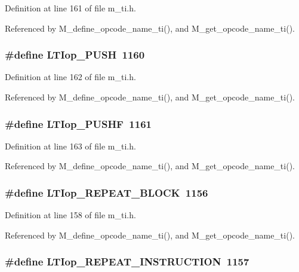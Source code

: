 Definition at line 161 of file m\_\-ti.h.

Referenced by M\_\-define\_\-opcode\_\-name\_\-ti(), and M\_\-get\_\-opcode\_\-name\_\-ti().
\subsubsection{\setlength{\rightskip}{0pt plus 5cm}\#define LTIop\_\-PUSH~1160}\label{m__ti_8h_01b504c987932f06e2611701fe6e2b5a}




Definition at line 162 of file m\_\-ti.h.

Referenced by M\_\-define\_\-opcode\_\-name\_\-ti(), and M\_\-get\_\-opcode\_\-name\_\-ti().
\subsubsection{\setlength{\rightskip}{0pt plus 5cm}\#define LTIop\_\-PUSHF~1161}\label{m__ti_8h_21097b126d9a1291f0eb8ce6a5ec7103}




Definition at line 163 of file m\_\-ti.h.

Referenced by M\_\-define\_\-opcode\_\-name\_\-ti(), and M\_\-get\_\-opcode\_\-name\_\-ti().
\subsubsection{\setlength{\rightskip}{0pt plus 5cm}\#define LTIop\_\-REPEAT\_\-BLOCK~1156}\label{m__ti_8h_f56575bf2c4d5e4aa2d42bf1f311ece1}




Definition at line 158 of file m\_\-ti.h.

Referenced by M\_\-define\_\-opcode\_\-name\_\-ti(), and M\_\-get\_\-opcode\_\-name\_\-ti().
\subsubsection{\setlength{\rightskip}{0pt plus 5cm}\#define LTIop\_\-REPEAT\_\-INSTRUCTION~1157}\label{m__ti_8h_a767d6e08e5aa576badbdabf7636085c}




